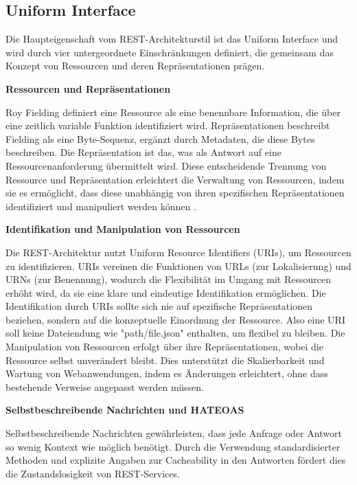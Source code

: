 \documentclass[draft,final]{vutinfth} %
\begin{document}
\subsection{Uniform Interface}

Die Haupteigenschaft vom REST-Architekturstil ist das Uniform Interface und wird durch vier untergeordnete Einschränkungen definiert, die gemeinsam das Konzept von Ressourcen und deren Repräsentationen prägen.

\textbf{{ Ressourcen und Repräsentationen}} 

Roy Fielding definiert eine Ressource als eine benennbare Information, die über eine zeitlich variable Funktion identifiziert wird. 
Repräsentationen beschreibt Fielding als eine Byte-Sequenz, ergänzt durch Metadaten, die diese Bytes beschreiben. Die Repräsentation ist das, was als Antwort auf eine Ressourcenanforderung übermittelt wird.
Diese entscheidende Trennung von Ressource und Repräsentation erleichtert die Verwaltung von Ressourcen, indem sie es ermöglicht, dass diese unabhängig von ihren spezifischen Repräsentationen identifiziert und manipuliert werden können \cite{Fielding:2000:REST}.


\textbf{{ Identifikation und Manipulation von Ressourcen}} 

Die REST-Architektur nutzt Uniform Resource Identifiers (URIs), um Ressourcen zu identifizieren. URIs vereinen die Funktionen von URLs (zur Lokalisierung) und URNs (zur Benennung), wodurch die Flexibilität im Umgang mit Ressourcen erhöht wird, da sie eine klare und eindeutige Identifikation ermöglichen. 
Die Identifikation durch URIs sollte sich nie auf spezifische Repräsentationen beziehen, sondern auf die konzeptuelle Einordnung der Ressource.
Also eine URI soll keine Dateiendung wie "path/file.json" enthalten, um flexibel zu bleiben.
Die Manipulation von Ressourcen erfolgt über ihre Repräsentationen, wobei die Ressource selbst unverändert bleibt. 
Dies unterstützt die Skalierbarkeit und Wartung von Webanwendungen, indem es Änderungen erleichtert, ohne dass bestehende Verweise angepasst werden müssen. \cite{Fielding:2000:REST}


\textbf{{ Selbstbeschreibende Nachrichten und HATEOAS}}

Selbstbeschreibende Nachrichten gewährleisten, dass jede Anfrage oder Antwort so wenig Kontext wie möglich benötigt. 
Durch die Verwendung standardisierter Methoden und explizite Angaben zur Cacheability in den Antworten fördert dies die Zustandslosigkeit von REST-Services.
\end{document}
